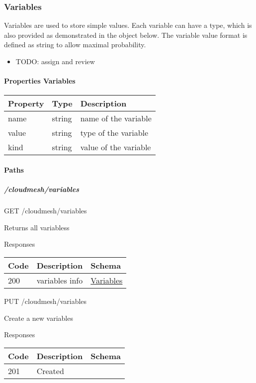 \documentclass[9pt,]{article}
\providecommand{\tightlist}{%
  \setlength{\itemsep}{0pt}\setlength{\parskip}{0pt}}
\let\oldparagraph\paragraph
\renewcommand{\paragraph}[1]{\oldparagraph{#1}\mbox{}}
\let\oldsubparagraph\subparagraph
\renewcommand{\subparagraph}[1]{\oldsubparagraph{#1}\mbox{}}
\begin{document}
\hypertarget{variables}{%
\subsubsection{Variables}\label{variables}}

Variables are used to store simple values. Each variable can have a
type, which is also provided as demonstrated in the object below. The
variable value format is defined as string to allow maximal probability.

\begin{itemize}
\tightlist
\item
  TODO: assign and review
\end{itemize}

\hypertarget{properties-variables}{%
\paragraph{Properties Variables}\label{properties-variables}}

\begin{longtable}[]{@{}lll@{}}
\toprule
Property & Type & Description\tabularnewline
\midrule
\endhead
name & string & name of the variable\tabularnewline
value & string & type of the variable\tabularnewline
kind & string & value of the variable\tabularnewline
\bottomrule
\end{longtable}

\hypertarget{paths-5}{%
\paragraph{Paths}\label{paths-5}}

\hypertarget{cloudmeshvariables}{%
\subparagraph{/cloudmesh/variables}\label{cloudmeshvariables}}

GET /cloudmesh/variables

Returns all variabless

Responses

\begin{longtable}[]{@{}lll@{}}
\toprule
Code & Description & Schema\tabularnewline
\midrule
\endhead
200 & variables info &
\protect\hyperlink{variables}{Variables}\tabularnewline
\bottomrule
\end{longtable}

PUT /cloudmesh/variables

Create a new variables

Responses

\begin{longtable}[]{@{}lll@{}}
\toprule
Code & Description & Schema\tabularnewline
\midrule
\endhead
201 & Created &\tabularnewline
\bottomrule
\end{longtable}
\end{document}
